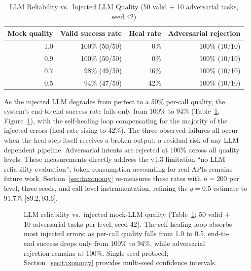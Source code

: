 ﻿\documentclass[12pt,a4paper]{article}
\begin{document}
\begin{table}[H]
\centering
\caption{LLM Reliability vs.\ Injected LLM Quality (50 valid + 10 adversarial tasks, seed 42)}
\label{tab:reliability}
\small
\begin{tabular}{@{}rrrr@{}}
\hline
\textbf{Mock quality} & \textbf{Valid success rate} & \textbf{Heal rate} & \textbf{Adversarial rejection} \\
\hline
1.0 & 100\% (50/50) & 0\%  & 100\% (10/10) \\
0.9 & 100\% (50/50) & 0\%  & 100\% (10/10) \\
0.7 &  98\% (49/50) & 16\% & 100\% (10/10) \\
0.5 &  94\% (47/50) & 42\% & 100\% (10/10) \\
\hline
\end{tabular}
\end{table}

As the injected LLM degrades from perfect to a 50\% per-call quality, the system's end-to-end success rate falls only from 100\% to 94\% (Table~\ref{tab:reliability}, Figure~\ref{fig:reliability}), with the self-healing loop compensating for the majority of the injected errors (heal rate rising to 42\%). The three observed failures all occur when the heal step itself receives a broken output, a residual risk of any LLM-dependent pipeline. Adversarial intents are rejected at 100\% across all quality levels. These measurements directly address the v1.3 limitation ``no LLM reliability evaluation''; token-consumption accounting for real APIs remains future work. Section~\ref{sec:taxonomy} re-measures these rates with $n{=}200$ per level, three seeds, and call-level instrumentation, refining the $q{=}0.5$ estimate to $91.7\%$ [$89.2, 93.6$].

\begin{figure}[H]
\centering
{}
\caption{LLM reliability vs.\ injected mock-LLM quality (Table~\ref{tab:reliability}; 50 valid $+$ 10 adversarial tasks per level, seed 42). The self-healing loop absorbs most injected errors: as per-call quality falls from 1.0 to 0.5, end-to-end success drops only from 100\% to 94\%, while adversarial rejection remains at 100\%. Single-seed protocol; Section~\ref{sec:taxonomy} provides multi-seed confidence intervals.}
\label{fig:reliability}
\end{figure}
\end{document}
